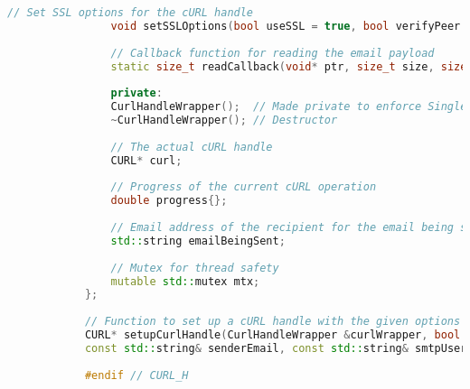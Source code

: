 \documentclass{article}
\begin{document}
\begin{mdframed}[backgroundcolor=background, hidealllines=false, innerleftmargin=15pt, innerrightmargin=5pt, innertopmargin=0pt, innerbottommargin=-5pt, linecolor=accent]
\begin{lstlisting}[language=C++]
				// Set SSL options for the cURL handle
				void setSSLOptions(bool useSSL = true, bool verifyPeer = true, bool verifyHost = true);
				
				// Callback function for reading the email payload
				static size_t readCallback(void* ptr, size_t size, size_t nmemb, void* userp);
				
				private:
				CurlHandleWrapper();  // Made private to enforce Singleton pattern
				~CurlHandleWrapper(); // Destructor
				
				// The actual cURL handle
				CURL* curl;
				
				// Progress of the current cURL operation
				double progress{};
				
				// Email address of the recipient for the email being sent
				std::string emailBeingSent;
				
				// Mutex for thread safety
				mutable std::mutex mtx;
			};
			
			// Function to set up a cURL handle with the given options
			CURL* setupCurlHandle(CurlHandleWrapper &curlWrapper, bool useSSL, bool verifyPeer, bool verifyHost, bool verbose,
			const std::string& senderEmail, const std::string& smtpUsername, std::string& mailPassDecrypted, int smtpPort, const std::string& smtpServer);
			
			#endif // CURL_H
			\end{lstlisting}
	\end{mdframed}
	
\end{document}
